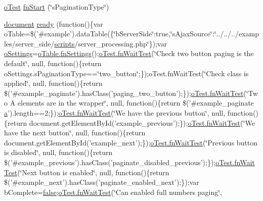 \begin{DoxyCompactItemize}
\item 
\hyperlink{unit__test_8js_a3b2d259e2df3b6860d9047a92d09d0d6}{o\+Test} \hyperlink{4__server-side_2s_pagination_type_8js_a2b5a58d4188841c45e1e03c76d7aa324}{fn\+Start} (\char`\"{}s\+Pagination\+Type\char`\"{})
\item 
\hyperlink{outside_events_8js_aa14f8e0338cced6720590fd2ea13bd4b}{document} \hyperlink{4__server-side_2s_pagination_type_8js_a24b3804e5b3f20a6f7add92a7d3b73db}{ready} (function()\{var o\+Table=\$('\#example').data\+Table(\{\char`\"{}b\+Server\+Side\char`\"{}\+:true,\char`\"{}s\+Ajax\+Source\char`\"{}\+:\char`\"{}../../../examples/server\+\_\+side/\hyperlink{tinymce_8jquery_8dev_8js_a09066d4d580eeec222f858d588b4cdef}{scripts}/server\+\_\+processing.\+php\char`\"{}\});var \hyperlink{model_8settings_8js_a4857b9c813b4dea010668e9555d0aca7}{o\+Settings}=\hyperlink{api_8methods_8js_a78f387fab92a85c2cb7830bc5d8a6141}{o\+Table.\+fn\+Settings}();\hyperlink{onhold_24__server-side_2__zero__config_8js_ab25c4d596771c0133cdc45178ce72c3d}{o\+Test.\+fn\+Wait\+Test}(\char`\"{}Check two button paging is the default\char`\"{}, null, function()\{return o\+Settings.\+s\+Pagination\+Type==\char`\"{}two\+\_\+button\char`\"{};\});o\+Test.\+fn\+Wait\+Test(\char`\"{}Check class is applied\char`\"{}, null, function()\{return \$('\#example\+\_\+paginate').has\+Class('paging\+\_\+two\+\_\+button');\});\hyperlink{onhold_24__server-side_2__zero__config_8js_ab25c4d596771c0133cdc45178ce72c3d}{o\+Test.\+fn\+Wait\+Test}(\char`\"{}Two A elements are in the wrapper\char`\"{}, null, function()\{return \$('\#example\+\_\+paginate \hyperlink{media_2js_2jquery_8js_aa4d4888597588a84fd5b1184d00c91f3}{a}').length==2;\});\hyperlink{onhold_24__server-side_2__zero__config_8js_ab25c4d596771c0133cdc45178ce72c3d}{o\+Test.\+fn\+Wait\+Test}(\char`\"{}We have the previous button\char`\"{}, null, function()\{return document.\+get\+Element\+By\+Id('example\+\_\+previous');\});\hyperlink{onhold_24__server-side_2__zero__config_8js_ab25c4d596771c0133cdc45178ce72c3d}{o\+Test.\+fn\+Wait\+Test}(\char`\"{}We have the next button\char`\"{}, null, function()\{return document.\+get\+Element\+By\+Id('example\+\_\+next');\});\hyperlink{onhold_24__server-side_2__zero__config_8js_ab25c4d596771c0133cdc45178ce72c3d}{o\+Test.\+fn\+Wait\+Test}(\char`\"{}Previous button is disabled\char`\"{}, null, function()\{return \$('\#example\+\_\+previous').has\+Class('paginate\+\_\+disabled\+\_\+previous');\});\hyperlink{onhold_24__server-side_2__zero__config_8js_ab25c4d596771c0133cdc45178ce72c3d}{o\+Test.\+fn\+Wait\+Test}(\char`\"{}Next button is enabled\char`\"{}, null, function()\{return \$('\#example\+\_\+next').has\+Class('paginate\+\_\+enabled\+\_\+next');\});var b\+Complete=\hyperlink{validate_8js_a5df37b7f02e5cdc7d9412b7f872b8e01}{false};\hyperlink{onhold_24__server-side_2__zero__config_8js_ab25c4d596771c0133cdc45178ce72c3d}{o\+Test.\+fn\+Wait\+Test}(\char`\"{}Can enabled full numbers paging\char`\"{}, 
\end{DoxyCompactItemize}

